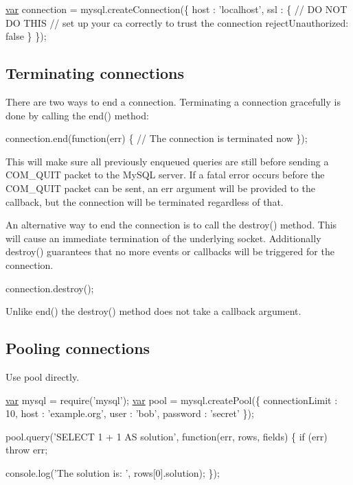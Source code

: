 \begin{DoxyCode}
\hyperlink{018__def_8c_a335628f2e9085305224b4f9cc6e95ed5}{var} connection = mysql.createConnection(\{
  host : \textcolor{stringliteral}{'localhost'},
  ssl  : \{
    \textcolor{comment}{// DO NOT DO THIS}
    \textcolor{comment}{// set up your ca correctly to trust the connection}
    rejectUnauthorized: \textcolor{keyword}{false}
  \}
\});
\end{DoxyCode}


\subsection*{Terminating connections}

There are two ways to end a connection. Terminating a connection gracefully is done by calling the {\ttfamily end()} method\+:


\begin{DoxyCode}
connection.end(\textcolor{keyword}{function}(err) \{
  \textcolor{comment}{// The connection is terminated now}
\});
\end{DoxyCode}


This will make sure all previously enqueued queries are still before sending a {\ttfamily C\+O\+M\+\_\+\+Q\+U\+I\+T} packet to the My\+S\+Q\+L server. If a fatal error occurs before the {\ttfamily C\+O\+M\+\_\+\+Q\+U\+I\+T} packet can be sent, an {\ttfamily err} argument will be provided to the callback, but the connection will be terminated regardless of that.

An alternative way to end the connection is to call the {\ttfamily destroy()} method. This will cause an immediate termination of the underlying socket. Additionally {\ttfamily destroy()} guarantees that no more events or callbacks will be triggered for the connection.


\begin{DoxyCode}
connection.destroy();
\end{DoxyCode}


Unlike {\ttfamily end()} the {\ttfamily destroy()} method does not take a callback argument.

\subsection*{Pooling connections}

Use pool directly. 
\begin{DoxyCode}
\hyperlink{018__def_8c_a335628f2e9085305224b4f9cc6e95ed5}{var} mysql = require(\textcolor{stringliteral}{'mysql'});
\hyperlink{018__def_8c_a335628f2e9085305224b4f9cc6e95ed5}{var} pool  = mysql.createPool(\{
  connectionLimit : 10,
  host            : \textcolor{stringliteral}{'example.org'},
  user            : \textcolor{stringliteral}{'bob'},
  password        : \textcolor{stringliteral}{'secret'}
\});

pool.query(\textcolor{stringliteral}{'SELECT 1 + 1 AS solution'}, \textcolor{keyword}{function}(err, rows, fields) \{
  \textcolor{keywordflow}{if} (err) \textcolor{keywordflow}{throw} err;

  console.log(\textcolor{stringliteral}{'The solution is: '}, rows[0].solution);
\});
\end{DoxyCode}


